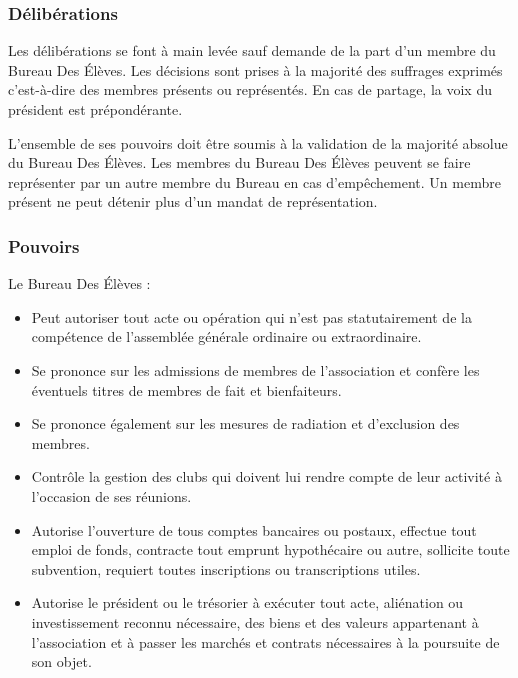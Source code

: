 \documentclass{article}
\begin{document}
			\subsubsection{Délibérations}
				Les délibérations se font à main levée sauf demande de la part d’un
				membre du Bureau Des Élèves. Les décisions sont prises à la majorité
				des	suffrages exprimés c’est-à-dire des membres présents ou
				représentés. En cas de partage, la voix du président est
				prépondérante.

				L’ensemble de ses pouvoirs doit être soumis à la validation de la
				majorité absolue du Bureau Des Élèves. Les membres du Bureau Des
				Élèves peuvent se faire représenter par un autre membre du Bureau en
				cas d’empêchement. Un membre présent ne peut détenir plus d’un mandat
				de représentation.

			\subsubsection{Pouvoirs}
				Le Bureau Des Élèves :
				\begin{itemize}
					\item Peut autoriser tout acte ou opération qui n’est pas
					    statutairement de la compétence de l’assemblée générale
					    ordinaire ou extraordinaire.
					\item Se prononce sur les admissions de membres de l’association
					    et confère les éventuels titres de membres de fait et
    					bienfaiteurs.
					\item Se prononce également sur les mesures de radiation et
	    				d’exclusion des membres.
					\item Contrôle la gestion des clubs qui doivent lui rendre compte
		    			de leur activité à l’occasion de ses réunions.
					\item Autorise l’ouverture de tous comptes bancaires ou postaux,
					    effectue tout emploi de fonds, contracte tout emprunt
					    hypothécaire ou autre, sollicite toute subvention, requiert
					    toutes inscriptions ou transcriptions utiles.
					\item Autorise le président ou le trésorier à exécuter tout acte,
					    aliénation ou investissement reconnu nécessaire, des biens et
					    des valeurs appartenant à l’association et à passer les
					    marchés et contrats nécessaires à la poursuite de son objet.
				\end{itemize}
\end{document}
